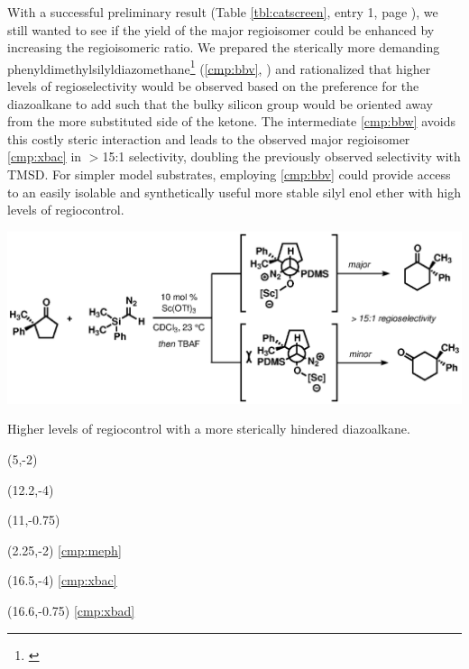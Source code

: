 With a successful preliminary result (Table \ref{tbl:catscreen}, entry 1, page
\pageref{tbl:catscreen}), we still wanted to see if the yield of the major regioisomer could be
enhanced by increasing the regioisomeric ratio. We prepared the sterically more demanding
phenyldimethylsilyldiazomethane\footnote{ \label{ref:bshioriorgsynth}} (\ref{cmp:bbv}, ) and
rationalized that higher levels of regioselectivity would be observed based on the preference for the
diazoalkane to add such that the bulky silicon group would be oriented away from
the more substituted side of the ketone. The intermediate \ref{cmp:bbw} avoids
this costly steric interaction and leads to the observed major regioisomer
\ref{cmp:xbac} in $>$15:1 selectivity, doubling the previously observed
selectivity with TMSD. For simpler model substrates, employing \ref{cmp:bbv} could provide
access to an easily isolable and synthetically useful more stable silyl enol ether with high
levels of regiocontrol.
\begin{Scheme}[t]
  \centering \includegraphics[scale=0.8]{chp_singlecarbon/images/pdmsd}
  \caption{Higher levels of regiocontrol with a more sterically hindered
  diazoalkane.}
\begin{textblock}{1}(5,-2)  \end{textblock}
\begin{textblock}{1}(12.2,-4)  \end{textblock}
\begin{textblock}{1}(11,-0.75)  \end{textblock}
\begin{textblock}{1}(2.25,-2) \textsf{\scriptsize{\ref{cmp:meph}}}
\end{textblock}
\begin{textblock}{1}(16.5,-4) \textsf{\scriptsize{\ref{cmp:xbac}}}
\end{textblock}
\begin{textblock}{1}(16.6,-0.75) \textsf{\scriptsize{\ref{cmp:xbad}}}
\end{textblock}
  \label{sch:pdmsd}
\end{Scheme}

